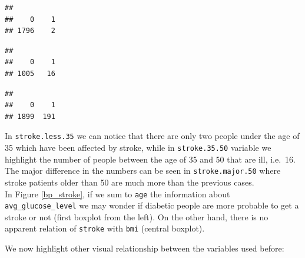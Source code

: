\documentclass[
]{article}
\newenvironment{Shaded}{\begin{snugshade}}{\end{snugshade}}
\newcommand{\DecValTok}[1]{\textcolor[rgb]{0.00,0.00,0.81}{#1}}
\newcommand{\FloatTok}[1]{\textcolor[rgb]{0.00,0.00,0.81}{#1}}
\newcommand{\FunctionTok}[1]{\textcolor[rgb]{0.00,0.00,0.00}{#1}}
\newcommand{\NormalTok}[1]{#1}
\newcommand{\OtherTok}[1]{\textcolor[rgb]{0.56,0.35,0.01}{#1}}
\newcommand{\SpecialCharTok}[1]{\textcolor[rgb]{0.00,0.00,0.00}{#1}}
\newcommand{\StringTok}[1]{\textcolor[rgb]{0.31,0.60,0.02}{#1}}
\begin{document}
\begin{verbatim}
## 
##    0    1 
## 1796    2
\end{verbatim}

\begin{Shaded}
\end{Shaded}

\begin{verbatim}
## 
##    0    1 
## 1005   16
\end{verbatim}

\begin{Shaded}
\end{Shaded}

\begin{verbatim}
## 
##    0    1 
## 1899  191
\end{verbatim}

In \texttt{stroke.less.35} we can notice that there are only two people
under the age of 35 which have been affected by stroke, while in
\texttt{stroke.35.50} variable we highlight the number of people between the age
of 35 and 50 that are ill, i.e.~16. The major difference in the numbers
can be seen in \texttt{stroke.major.50} where stroke patients older than
50 are much more than the previous cases.\\
In Figure \ref{bp_stroke}, if we sum to \texttt{age} the information
about \texttt{avg\_glucose\_level} we may wonder if diabetic people are
more probable to get a stroke or not (first boxplot from the left). On
the other hand, there is no apparent relation of \texttt{stroke} with
\texttt{bmi} (central boxplot).

We now highlight other visual relationship between the variables used
before:
\end{document}
